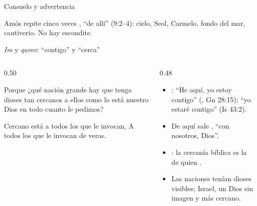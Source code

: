 \begin{frame}{Consuelo y advertencia}
\centering
{}\par\medskip
\small\RaggedRight Amós repite cinco veces , ``de allí'' (9:2--4): cielo, Seol, Carmelo, fondo del mar, cautiverio. No hay escondite.
\end{frame}

\begin{frame}{\emph{Im} y \emph{qarov}: ``contigo'' y ``cerca''}
\begin{columns}[t,onlytextwidth]
\begin{column}{0.50\textwidth}
\begin{cita}[fontupper=\scriptsize\itshape]Porque ¿qué nación grande hay que tenga dioses tan cercanos a ellos como lo está \SENOR{} nuestro Dios en todo cuanto le pedimos?\end{cita}
\begin{cita}[fontupper=\scriptsize\itshape]Cercano está \SENOR{} a todos los que le invocan, A todos los que le invocan de veras.\end{cita}
\end{column}
\begin{column}{0.48\textwidth}\small
\begin{itemize}
\item {}: ``He aquí, yo estoy contigo'' (, Gn 28:15); ``yo estaré contigo'' (Is 43:2).
\item De aquí sale , ``con nosotros, Dios''.
\item {}: la cercanía bíblica es la de quien .
\item Las naciones tenían dioses visibles; Israel, un Dios sin imagen y más cercano.
\end{itemize}
\end{column}
\end{columns}
\end{frame}

